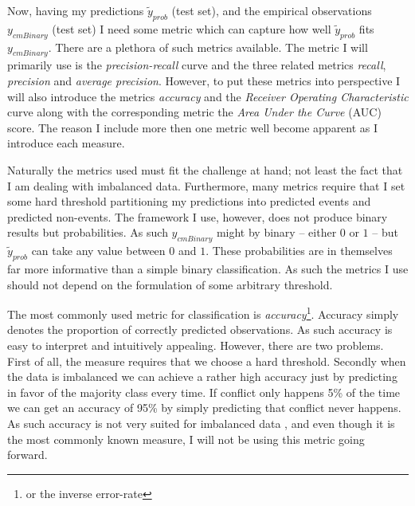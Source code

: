 \documentclass[a4paper]{article}
\begin{document}
Now, having my predictions $\tilde{y}_{prob}$ (test set), and the empirical observations $y_{cmBinary}$ (test set) I need some metric which can capture how well  $\tilde{y}_{prob}$ fits $y_{cmBinary}$. There are a plethora of such metrics available. The metric I will primarily use is the \emph{precision-recall} curve and the three related metrics \emph{recall}, \emph{precision} and \emph{average precision}. However, to put these metrics into perspective I will also introduce the metrics \emph{accuracy} and the \emph{Receiver Operating Characteristic} curve along with the corresponding metric the \emph{Area Under the Curve} (AUC) score. The reason I include more then one metric well become apparent as I introduce each measure.\par

Naturally the metrics used must fit the challenge at hand; not least the fact that I am dealing with imbalanced data. Furthermore, many metrics require that I set some hard threshold partitioning my predictions into predicted events and predicted non-events. The framework I use, however, does not produce binary results but probabilities. As such $y_{cmBinary}$ might by binary  -- either $0$ or $1$ -- but $\tilde{y}_{prob}$ can take any value between $0$ and $1$. These probabilities are in themselves far more informative than a simple binary classification. As such the metrics I use should not depend on the formulation of some arbitrary threshold.\par 

The most commonly used metric for classification is \emph{accuracy}\footnote{or the inverse error-rate}. Accuracy simply denotes the proportion of correctly predicted observations. As such accuracy is easy to interpret and intuitively appealing. However, there are two problems. First of all, the measure requires that we choose a hard threshold. Secondly when the data is imbalanced we can achieve a rather high accuracy just by predicting in favor of the majority class every time. If conflict only happens 5\% of the time we can get an accuracy of 95\% by simply predicting that conflict never happens. As such accuracy is not very suited for imbalanced data \citep[1264]{He_2008}, and even though it is the most commonly known measure, I will not be using this metric going forward.\par
\end{document}
